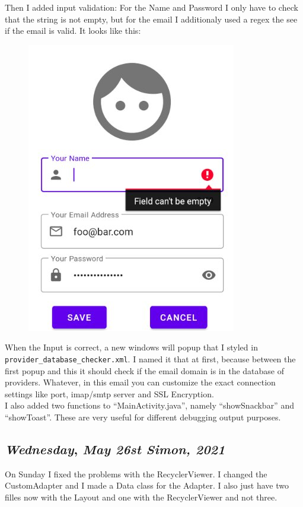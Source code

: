 Then I added input validation: For the Name and Password I only have to check that the string is not empty, but for the email I additionaly used a regex the see if the email is valid. It looks like this:\\

\begin{figure}[H]
\centering
\includegraphics[height=.3\textheight]{media/newemail}
\end{figure}

When the Input is correct, a new windows will popup that I styled in \texttt{provider\_database\_checker.xml}. I named it that at first, because between the first popup and this it should check if the email domain is in the database of providers. Whatever, in this email you can customize the exact connection settings like port, imap/smtp server and SSL Encryption.\\

I also added two functions to ``MainActivity.java'', namely ``showSnackbar'' and ``showToast''. These are very useful for different debugging output purposes.



\def\day{\textit{May 26st Simon, 2021}}
\def\weekday{\textit{Wednesday}}
\subsection*{\weekday, \day}

On Sunday I fixed the problems with the RecyclerViewer. I changed the CustomAdapter and I made a Data class for the Adapter. I also  just have two filles now with the Layout and one with the
RecyclerViewer and not three. 




















